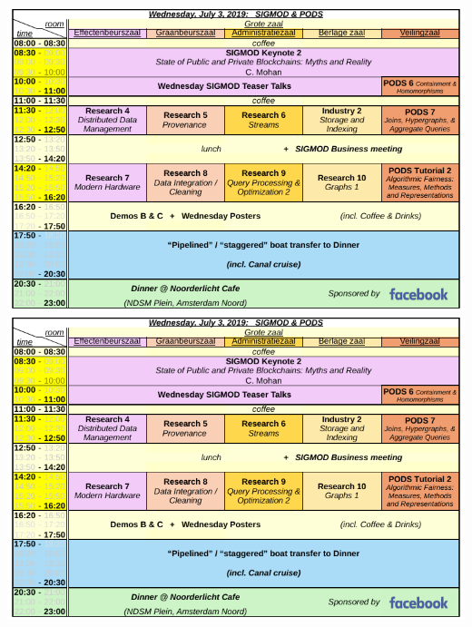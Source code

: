 \ifodd\value{page}
\includegraphics[angle=270,width=\textwidth]{schedule/p4.pdf}%
\else
\includegraphics[angle=90,width=\textwidth]{schedule/p4.pdf}%
\fi

\newpage

